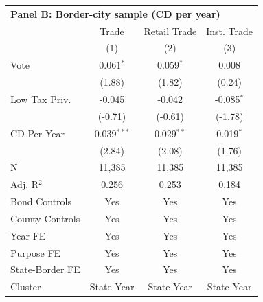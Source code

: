 \begingroup
\centering
\begin{tabular*}{\textwidth}{@{\extracolsep{\fill}}lccc}
\multicolumn{5}{l}{\textbf{Panel B: Border-city sample (CD per year)}}\\

\addlinespace
   \toprule
                   & Trade         & Retail Trade & Inst. Trade\\  
                   & (1)           & (2)          & (3)\\  
   \midrule 
   Vote            & 0.061$^{*}$   & 0.059$^{*}$  & 0.008\\   
                   & (1.88)       & (1.82)      & (0.24)\\   
   Low Tax Priv.   & -0.045        & -0.042       & -0.085$^{*}$\\   
                   & (-0.71)      & (-0.61)     & (-1.78)\\   
   CD Per Year     & 0.039$^{***}$ & 0.029$^{**}$ & 0.019$^{*}$\\   
                   & (2.84)       & (2.08)      & (1.76)\\   
   \hline
   N    & 11,385        & 11,385       & 11,385\\  
   Adj. R$^2$  & 0.256         & 0.253        & 0.184\\  
   Bond Controls   & Yes           & Yes          & Yes\\  
   County Controls & Yes           & Yes          & Yes\\  
   Year FE         & Yes           & Yes          & Yes\\  
   Purpose FE      & Yes           & Yes          & Yes\\  
   State-Border FE & Yes           & Yes          & Yes\\  
   Cluster              & State-Year & State-Year & State-Year\\  
   \bottomrule
\end{tabular*}
\par\endgroup
